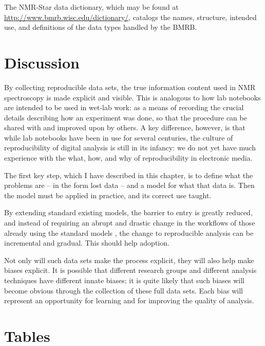 The NMR-Star data dictionary, which may be found at 
\url{http://www.bmrb.wisc.edu/dictionary/}, catalogs the names, structure,
intended use, and definitions of the data types handled by the BMRB.


\section{Discussion}
By collecting reproducible data sets, the true information content used in
NMR spectroscopy is made explicit and visible.  This is analogous to how lab
notebooks are intended to be used in wet-lab work: as a means of recording
the crucial details describing how an experiment was done, so that the procedure
can be shared with and improved upon by others.  A key difference, however, is
that while lab notebooks have been in use for several centuries, the culture
of reproducibility of digital analysis is still in its infancy: we do not yet
have much experience with the what, how, and why of reproducibility in 
electronic media.

The first key step, which I have described in this chapter, is to define what
the problems are -- in the form lost data -- and a model for what that data is.
Then the model must be applied in practice, and its correct use taught.

By extending standard existing models, the barrier to entry is greatly reduced,
and instead of requiring an abrupt and drastic change in the workflows of those
already using the standard models \cite{bmrb, ccpn}, the change to reproducible
analysis can be incremental and gradual.  This should help adoption.

Not only will such data sets make the process explicit, they will also help
make biases explicit.  It is possible that different research groups and
different analysis techniques have different innate biases; it is quite likely
that such biases will become obvious through the collection of these full data
sets.  Each bias will represent an opportunity for learning and for improving
the quality of analysis.


\clearpage
\section{Tables}

